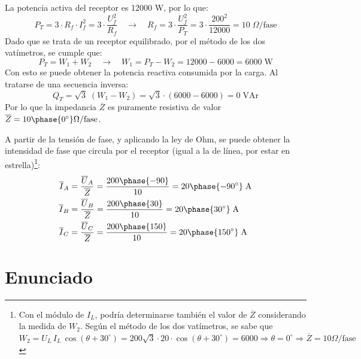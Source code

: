 La potencia activa del receptor es 12000 W, por lo que:
\begin{equation*}
    P_T=3\cdot R_f\cdot I_f^2=3\cdot \dfrac{U_f^2}{R_f} \quad\rightarrow\quad R_f=3\cdot\dfrac{U_f^2}{P_T}=3\cdot \dfrac{200^2}{12000}=10\;\Omega\text{/fase}
\end{equation*}
Dado que se trata de un receptor equilibrado, por el método de los dos vatímetros, se cumple que:
\begin{equation*}
    P_T=W_1+W_2 \quad\rightarrow\quad W_1=P_T-W_2=12000-6000=6000\;\text{W}
\end{equation*}
Con esto se puede obtener la potencia reactiva consumida por la carga. Al tratarse de una secuencia inversa:
\begin{equation*}
    Q_T=\sqrt{3}\; (W_1-W_2)=\sqrt{3}\cdot (6000-6000)=0\;\text{VAr}
\end{equation*}
Por lo que la impedancia $\overline{Z}$ es puramente resistiva de valor $\overline{Z}={10\phase{0^\circ}}\Omega/\mathrm{fase}$.

\vspace{3mm}
A partir de la tensión de fase, y aplicando la ley de Ohm, se puede obtener la intensidad de fase que circula por el receptor (igual a la de línea, por estar en estrella)\footnote{Con el módulo de $I_L$, podría determinarse también el valor de $\overline{Z}$ considerando la medida de $W_2$. Según el método de los dos vatímetros, se sabe que $W_2=U_L\,I_L\,\cos(\theta+30^\circ)=200\sqrt{3}\cdot 20\cdot \cos(\theta+30^\circ)=6000\Rightarrow \theta = 0^\circ\Rightarrow\overline{Z}=10\Omega/\mathrm{fase}$}:
\begin{align*}
    \overline{I}_A&=\dfrac{\overline{U}_{A}}{\overline{Z}}=\dfrac{200\phase{-90}}{10}={20\phase{-90^\circ}\;\text{A}}\\
    \overline{I}_B&=\dfrac{\overline{U}_{B}}{\overline{Z}}=\dfrac{200\phase{30}}{10}={20\phase{30^\circ}\;\text{A}}\\
    \overline{I}_C&=\dfrac{\overline{U}_{C}}{\overline{Z}}=\dfrac{200\phase{150}}{10}={20\phase{150^\circ}\;\text{A}}
\end{align*}




 \section{Enunciado}
 
